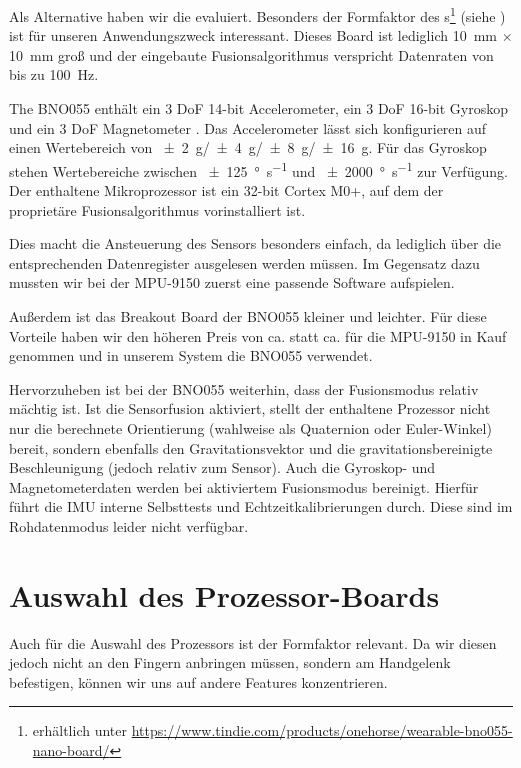 Als Alternative haben wir die  evaluiert.
Besonders der Formfaktor des s\footnote{erhältlich unter
\url{https://www.tindie.com/products/onehorse/wearable-bno055-nano-board/}}
(siehe ) ist
für unseren Anwendungszweck interessant. Dieses Board ist lediglich \SI{10}{mm}
$\times$ \SI{10}{mm} groß und der eingebaute Fusionsalgorithmus verspricht
Datenraten von bis zu \SI{100}{Hz}.

The BNO055 enthält ein 3 DoF 14-bit Accelerometer, ein 3 DoF 16-bit Gyroskop
und ein 3 DoF Magnetometer \citep{bno055-datasheet}. Das Accelerometer lässt
sich konfigurieren auf einen Wertebereich von
\SI{+-2}{g}/\SI{+-4}{g}/\SI{+-8}{g}/\SI{+-16}{g}. Für das Gyroskop stehen
Wertebereiche zwischen \SI{+-125}{\degree\per\second} und
\SI{+-2000}{\degree\per\second} zur Verfügung. Der enthaltene Mikroprozessor
ist ein 32-bit Cortex M0+, auf dem der proprietäre  Fusionsalgorithmus vorinstalliert ist.

Dies macht die Ansteuerung des Sensors besonders einfach, da lediglich über
\iic die entsprechenden Datenregister ausgelesen werden müssen. Im Gegensatz
dazu mussten wir bei der MPU-9150 zuerst eine passende Software aufspielen.

Außerdem ist das Breakout Board der BNO055 kleiner und leichter. Für diese
Vorteile haben wir den höheren Preis von ca.  statt ca. 
für die MPU-9150 in Kauf genommen und in unserem System die BNO055 verwendet.

Hervorzuheben ist bei der BNO055 weiterhin, dass der Fusionsmodus relativ
mächtig ist. Ist die Sensorfusion aktiviert, stellt der enthaltene Prozessor
nicht nur die berechnete Orientierung (wahlweise als Quaternion oder
Euler-Winkel) bereit, sondern ebenfalls den Gravitationsvektor und die
gravitationsbereinigte Beschleunigung (jedoch relativ zum Sensor). Auch die
Gyroskop- und Magnetometerdaten werden bei aktiviertem Fusionsmodus bereinigt.
Hierfür führt die IMU interne Selbsttests und Echtzeitkalibrierungen durch.
Diese sind im Rohdatenmodus leider nicht verfügbar.

\section{Auswahl des Prozessor-Boards}

Auch für die Auswahl des Prozessors ist der Formfaktor relevant. Da wir diesen
jedoch nicht an den Fingern anbringen müssen, sondern am Handgelenk befestigen,
können wir uns auf andere Features konzentrieren.

